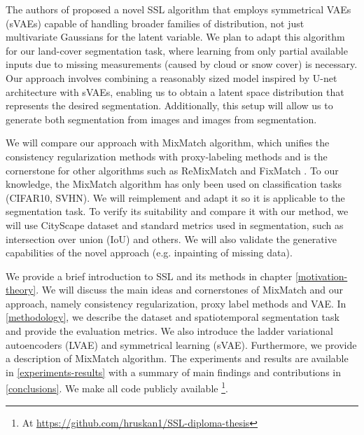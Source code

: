 The authors of \cite{not-published} proposed a novel SSL algorithm that employs symmetrical VAEs (sVAEs) capable of
handling broader families of distribution, not just multivariate Gaussians for the latent variable. We plan to adapt this algorithm for our 
land-cover segmentation task, where learning from only partial available inputs due to missing measurements (caused by cloud or snow cover) is necessary. 
Our approach involves combining a reasonably sized model inspired by U-net architecture \cite{unet-2015} with sVAEs, enabling us to obtain a 
latent space distribution that represents the desired segmentation. Additionally, this setup will allow us to generate both segmentation from images 
and images from segmentation.

We will compare our approach with MixMatch \cite{mixmatch-2019} algorithm, which unifies the consistency regularization methods with proxy-labeling
methods \cite{ssl-overview-2020} and is the cornerstone for other algorithms such as ReMixMatch \cite{remixmatch-2020} and FixMatch \cite{fixmatch-2020}.
To our knowledge, the MixMatch algorithm has only been used on classification tasks (CIFAR10, SVHN). We will reimplement and adapt it so it is applicable
to the segmentation task. To verify its suitability and compare it with our method, we will use CityScape dataset and standard metrics used in 
segmentation, such as intersection over union (IoU) and others. We will also validate the generative capabilities of the novel approach (e.g. 
inpainting of missing data).

We provide a brief introduction to SSL and its methods in chapter \ref{motivation-theory}. We will discuss the main ideas and cornerstones of 
MixMatch and our approach, namely consistency regularization, proxy label methods and VAE. In \ref{methodology}, we describe the dataset and 
spatiotemporal segmentation task and provide the evaluation metrics. We also introduce the ladder variational  autoencoders (LVAE) and 
symmetrical learning (sVAE). Furthermore, we provide a description of MixMatch algorithm. The experiments and results are available in 
\ref{experiments-results} with a summary of main findings and contributions in \ref{conclusions}. We make all code publicly available
\footnote[2]{At \url{https://github.com/hruskan1/SSL-diploma-thesis}}. 





